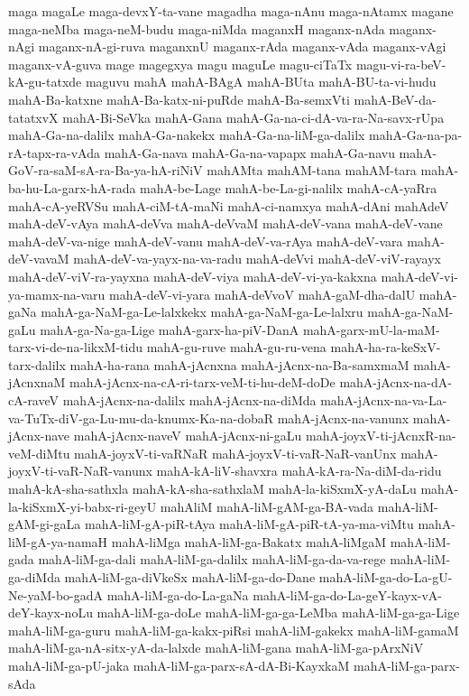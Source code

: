 {maga
magaLe
maga-devxY-ta-vane
magadha
maga-nAnu
maga-nAtamx
magane
maga-neMba
maga-neM-budu
maga-niMda
maganxH
maganx-nAda
maganx-nAgi
maganx-nA-gi-ruva
maganxnU
maganx-rAda
maganx-vAda
maganx-vAgi
maganx-vA-guva
mage
magegxya
magu
maguLe
magu-ciTaTx
magu-vi-ra-beV-kA-gu-tatxde
maguvu
mahA
mahA-BAgA
mahA-BUta
mahA-BU-ta-vi-hudu
mahA-Ba-katxne
mahA-Ba-katx-ni-puRde
mahA-Ba-semxVti
mahA-BeV-da-tatatxvX
mahA-Bi-SeVka
mahA-Gana
mahA-Ga-na-ci-dA-va-ra-Na-savx-rUpa
mahA-Ga-na-dalilx
mahA-Ga-nakekx
mahA-Ga-na-liM-ga-dalilx
mahA-Ga-na-pa-rA-tapx-ra-vAda
mahA-Ga-nava
mahA-Ga-na-vapapx
mahA-Ga-navu
mahA-GoV-ra-saM-sA-ra-Ba-ya-hA-riNiV
mahAMta
mahAM-tana
mahAM-tara
mahA-ba-hu-La-garx-hA-rada
mahA-be-Lage
mahA-be-La-gi-nalilx
mahA-cA-yaRra
mahA-cA-yeRVSu
mahA-ciM-tA-maNi
mahA-ci-namxya
mahA-dAni
mahAdeV
mahA-deV-vAya
mahA-deVva
mahA-deVvaM
mahA-deV-vana
mahA-deV-vane
mahA-deV-va-nige
mahA-deV-vanu
mahA-deV-va-rAya
mahA-deV-vara
mahA-deV-vavaM
mahA-deV-va-yayx-na-va-radu
mahA-deVvi
mahA-deV-viV-rayayx
mahA-deV-viV-ra-yayxna
mahA-deV-viya
mahA-deV-vi-ya-kakxna
mahA-deV-vi-ya-mamx-na-varu
mahA-deV-vi-yara
mahA-deVvoV
mahA-gaM-dha-dalU
mahA-gaNa
mahA-ga-NaM-ga-Le-lalxkekx
mahA-ga-NaM-ga-Le-lalxru
mahA-ga-NaM-gaLu
mahA-ga-Na-ga-Lige
mahA-garx-ha-piV-DanA
mahA-garx-mU-la-maM-tarx-vi-de-na-likxM-tidu
mahA-gu-ruve
mahA-gu-ru-vena
mahA-ha-ra-keSxV-tarx-dalilx
mahA-ha-rana
mahA-jAcnxna
mahA-jAcnx-na-Ba-samxmaM
mahA-jAcnxnaM
mahA-jAcnx-na-cA-ri-tarx-veM-ti-hu-deM-doDe
mahA-jAcnx-na-dA-cA-raveV
mahA-jAcnx-na-dalilx
mahA-jAcnx-na-diMda
mahA-jAcnx-na-va-La-va-TuTx-diV-ga-Lu-mu-da-knumx-Ka-na-dobaR
mahA-jAcnx-na-vanunx
mahA-jAcnx-nave
mahA-jAcnx-naveV
mahA-jAcnx-ni-gaLu
mahA-joyxV-ti-jAcnxR-na-veM-diMtu
mahA-joyxV-ti-vaRNaR
mahA-joyxV-ti-vaR-NaR-vanUnx
mahA-joyxV-ti-vaR-NaR-vanunx
mahA-kA-liV-shavxra
mahA-kA-ra-Na-diM-da-ridu
mahA-kA-sha-sathxla
mahA-kA-sha-sathxlaM
mahA-la-kiSxmX-yA-daLu
mahA-la-kiSxmX-yi-babx-ri-geyU
mahAliM
mahA-liM-gAM-ga-BA-vada
mahA-liM-gAM-gi-gaLa
mahA-liM-gA-piR-tAya
mahA-liM-gA-piR-tA-ya-ma-viMtu
mahA-liM-gA-ya-namaH
mahA-liMga
mahA-liM-ga-Bakatx
mahA-liMgaM
mahA-liM-gada
mahA-liM-ga-dali
mahA-liM-ga-dalilx
mahA-liM-ga-da-va-rege
mahA-liM-ga-diMda
mahA-liM-ga-diVkeSx
mahA-liM-ga-do-Dane
mahA-liM-ga-do-La-gU-Ne-yaM-bo-gadA
mahA-liM-ga-do-La-gaNa
mahA-liM-ga-do-La-geY-kayx-vA-deY-kayx-noLu
mahA-liM-ga-doLe
mahA-liM-ga-ga-LeMba
mahA-liM-ga-ga-Lige
mahA-liM-ga-guru
mahA-liM-ga-kakx-piRsi
mahA-liM-gakekx
mahA-liM-gamaM
mahA-liM-ga-nA-sitx-yA-da-lalxde
mahA-liM-gana
mahA-liM-ga-pArxNiV
mahA-liM-ga-pU-jaka
mahA-liM-ga-parx-sA-dA-Bi-KayxkaM
mahA-liM-ga-parx-sAda
}
